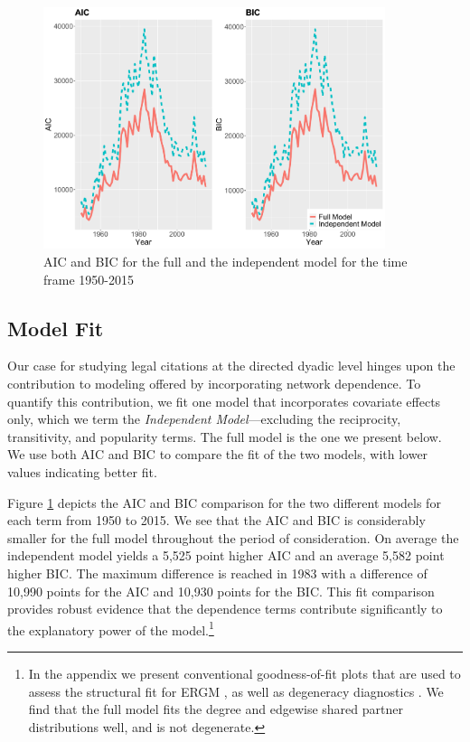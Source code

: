 \documentclass{cup-pan}
\begin{document}
\begin{figure}[bt]
\centering
\includegraphics[width=10cm ]{SCC_AIC_BIC.pdf}
\caption{AIC and BIC for the full and the independent model for the time frame 1950-2015 }
 \label{AIC_BIC}
\end{figure}
 
\subsection{Model Fit}

Our case for studying legal citations at the directed dyadic level hinges upon the contribution to modeling offered by incorporating network dependence. To quantify this contribution, we fit one model that incorporates covariate effects only, which we term the {\em Independent Model}---excluding the reciprocity, transitivity, and popularity terms. The full model is the one we present below. We use both AIC and BIC to compare the fit of the two models, with lower values indicating better fit.  


Figure \ref{AIC_BIC} depicts the AIC and BIC comparison for the two different models for each term from 1950 to 2015. We see that the AIC and BIC is considerably smaller for the full model throughout the period of consideration. On average the independent model yields a 5,525 point higher AIC and an average 5,582 point higher BIC. The maximum difference is reached in 1983 with a difference of 10,990 points for the AIC and 10,930 points for the BIC. This fit comparison provides robust evidence that the dependence terms contribute significantly to the explanatory power of the model.\footnote{In the appendix we present conventional goodness-of-fit plots that are used to assess the structural fit for ERGM \citep{hunter2008goodness}, as well as degeneracy diagnostics \citep{mukherjee2020degeneracy}. We find that the full model fits the degree and edgewise shared partner distributions well, and is not degenerate.} 
\end{document}
